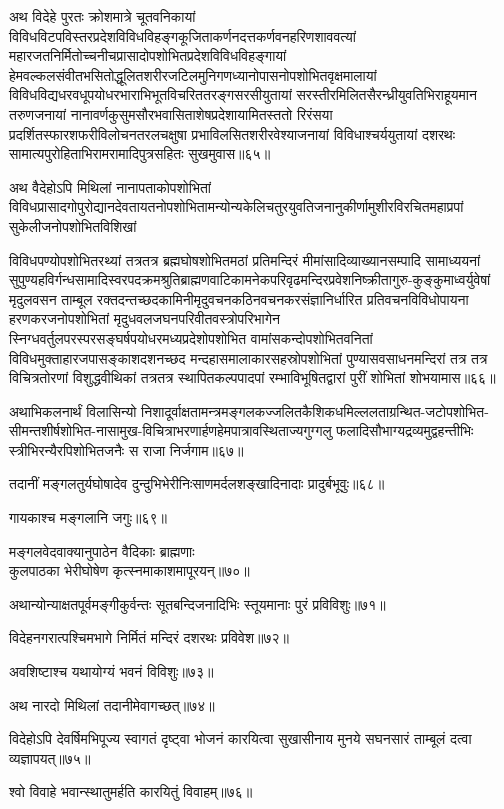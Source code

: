 \begin{flushleft}
अथ विदेहे पुरतः क्रोशमात्रे चूतवनिकायां विविधविटपविस्तरप्रदेशविविधविहङ्गकूजिताकर्णनदत्तकर्णवनहरिणशाववत्यां महारजतनिर्मितोच्चनीचप्रासादोपशोभितप्रदेशविविधविहङ्गायां हेमवल्कलसंवीतभसितोद्धूलितशरीरजटिलमुनिगणध्यानोपासनोपशोभितवृक्षमालायां विविधविद्यधरवधूपयोधरभाराभिभूतविचरिततरङ्गसरसीयुतायां सरस्तीरमिलितसैरन्ध्रीयुवतिभिराहूयमान तरुणजनायां नानावर्णकुसुमसौरभवासिताशेषप्रदेशायामितस्ततो रिरंसया प्रदर्शितस्फारशफरीविलोचनतरलचक्षुषा प्रभाविलसितशरीरवेश्याजनायां विविधाश्चर्ययुतायां दशरथः सामात्यपुरोहिताभिरामरामादिपुत्रसहितः सुखमुवास॥६५॥

अथ वैदेहोऽपि मिथिलां नानापताकोपशोभितां विविधप्रासादगोपुरोद्यानदेवतायतनोपशोभितामन्योन्यकेलिचतुरयुवतिजनानुकीर्णामुशीरविरचितमहाप्रपां सुकेलीजनोपशोभितविशिखां

विविधपण्योपशोभितरथ्यां तत्रतत्र ब्रह्मघोषशोभितमठां प्रतिमन्दिरं मीमांसादिव्याख्यानसम्पादि सामाध्ययनां सुपुण्यहविर्गन्धसामादिस्वरपदक्रमश्रुतिब्राह्मणवाटिकामनेकपरिवृढमन्दिरप्रवेशनिष्क्रीतागुरु-कुङ्कुमाध्वर्युवेषां मृदुलवसन ताम्बूल रक्तदन्तच्छदकामिनीमृदुवचनकठिनवचनकरसंज्ञानिर्धारित प्रतिवचनविविधोपायना हरणकरजनोपशोभितां मृदुधवलजघनपरिवीतवस्त्रोपरिभागेन स्निग्धवर्तुलपरस्परसङ्घर्षपयोधरमध्यप्रदेशोपशोभित वामांसकन्दोपशोभितवनितां विविधमुक्ताहारजपासङ्काशदशनच्छद मन्दहासमालाकारसहस्रोपशोभितां पुण्यासवसाधनमन्दिरां तत्र तत्र विचित्रतोरणां विशुद्धवीथिकां तत्रतत्र स्थापितकल्पपादपां रम्भाविभूषितद्वारां पुरीं शोभितां शोभयामास॥६६॥

अथाभिकलनार्थं विलासिन्यो निशादूर्वाक्षतामन्त्रमङ्गलकज्जलितकैशिकधमिल्ललताग्रन्थित-जटोपशोभित-सीमन्तशीर्षशोभित-नासामुख-विचित्राभरणार्हणहेमपात्रावस्थिताज्यगुग्गलु फलादिसौभाग्यद्रव्यमुद्वहन्तीभिः स्त्रीभिरन्यैरपिशोभितजनैः स राजा निर्जगाम॥६७॥

तदानीं मङ्गलतुर्यघोषादेव दुन्दुभिभेरीनिःसाणमर्दलशङ्खादिनादाः प्रादुर्बभूवुः॥६८॥

गायकाश्च मङ्गलानि जगुः॥६९॥

मङ्गलवेदवाक्यानुपाठेन वैदिकाः ब्राह्मणाः\\
कुलपाठका भेरीघोषेण कृत्स्नमाकाशमापूरयन्॥७०॥

अथान्योन्याक्षतपूर्वमङ्गीकुर्वन्तः सूतबन्दिजनादिभिः स्तूयमानाः पुरं प्रविविशुः॥७१॥

विदेहनगरात्पश्चिमभागे निर्मितं मन्दिरं दशरथः प्रविवेश॥७२॥

अवशिष्टाश्च यथायोग्यं भवनं विविशुः॥७३॥

अथ नारदो मिथिलां तदानीमेवागच्छत्॥७४॥

विदेहोऽपि देवर्षिमभिपूज्य स्वागतं दृष्ट्वा भोजनं कारयित्वा सुखासीनाय मुनये सघनसारं ताम्बूलं दत्वा व्यज्ञापयत्॥७५॥

श्वो विवाहे भवान्स्थातुमर्हति कारयितुं विवाहम्॥७६॥


\end{flushleft}
